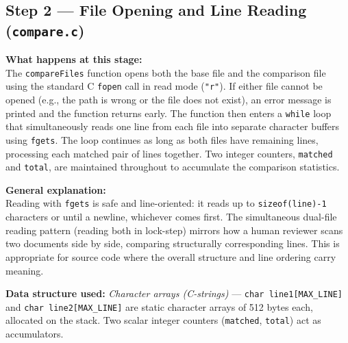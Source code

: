 \documentclass[12pt,a4paper]{article}
\begin{document}
\subsection{Step 2 — File Opening and Line Reading (\texttt{compare.c})}

\textbf{What happens at this stage:}\\
The \texttt{compareFiles} function opens both the base file and the comparison file using the standard C \texttt{fopen} call in read mode (\texttt{"r"}). If either file cannot be opened (e.g., the path is wrong or the file does not exist), an error message is printed and the function returns early. The function then enters a \texttt{while} loop that simultaneously reads one line from each file into separate character buffers using \texttt{fgets}. The loop continues as long as both files have remaining lines, processing each matched pair of lines together. Two integer counters, \texttt{matched} and \texttt{total}, are maintained throughout to accumulate the comparison statistics.

\smallskip
\textbf{General explanation:}\\
Reading with \texttt{fgets} is safe and line-oriented: it reads up to \texttt{sizeof(line)-1} characters or until a newline, whichever comes first. The simultaneous dual-file reading pattern (reading both in lock-step) mirrors how a human reviewer scans two documents side by side, comparing structurally corresponding lines. This is appropriate for source code where the overall structure and line ordering carry meaning.

\smallskip
\textbf{Data structure used:} \textit{Character arrays (C-strings)} — \texttt{char line1[MAX\_LINE]} and \texttt{char line2[MAX\_LINE]} are static character arrays of 512 bytes each, allocated on the stack. Two scalar integer counters (\texttt{matched}, \texttt{total}) act as accumulators.
\end{document}
